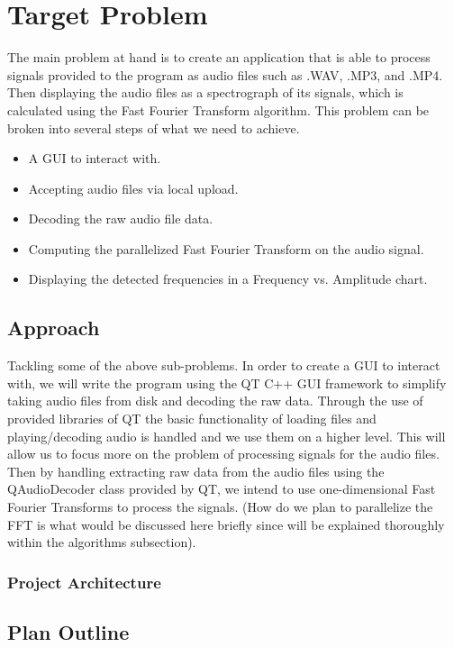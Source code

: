 \documentclass[journal]{IEEEtran}
\begin{document}
\section{Target Problem}
	\par {The main problem at hand is to create an application that is able to process signals 
	provided to the program as audio files such as .WAV, .MP3, and .MP4. Then displaying the audio 
	files as a spectrograph of its signals, which is calculated using the Fast Fourier Transform
	algorithm. This problem can be broken into several steps of 
	what we need to achieve.}

\begin{itemize}
	\item A GUI to interact with.
	\item Accepting audio files via local upload.
	\item Decoding the raw audio file data.
	\item Computing the parallelized Fast Fourier Transform on the audio signal.
	\item Displaying the detected frequencies in a Frequency vs. Amplitude chart.
\end{itemize}

\subsection{Approach}\label{Approach}
	\par {Tackling some of the above sub-problems. In order to create a GUI to interact with, 
	we will write the program using the QT C++ GUI framework to simplify taking audio files 
	from disk and decoding the raw data. Through the use of provided libraries of QT the 
	basic functionality of loading files and playing/decoding audio is handled and we use 
	them on a higher level. This will allow us to focus more on the problem of processing 
	signals for the audio files. Then by handling extracting raw data from the audio files 
	using the QAudioDecoder class provided by QT, we intend to use one-dimensional Fast 
	Fourier Transforms to process the signals. (How do we plan to parallelize the FFT is 
	what would be discussed here briefly since will be explained thoroughly within 
	the algorithms subsection).}
\subsubsection{Project Architecture}


\subsection{Plan Outline}
\end{document}
